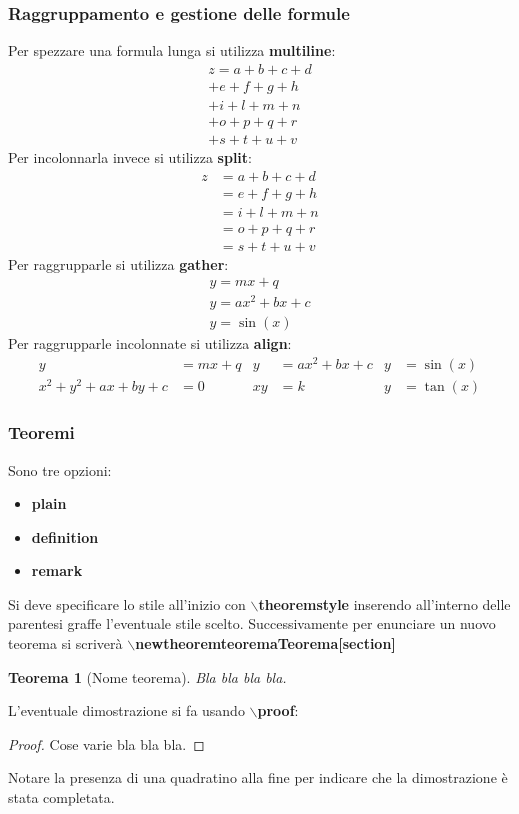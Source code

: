 \documentclass[a4paper, 12pt]{book}
\theoremstyle{plain}
\newtheorem{teorema}{Teorema}[section]
\begin{document}
	\subsubsection{Raggruppamento e gestione delle formule}
	Per spezzare una formula lunga si utilizza \textbf{multiline}:
	\begin{multline}
		z = a + b + c + d\\
		+ e + f + g + h\\
		+ i + l + m + n\\
		+ o + p + q + r\\
		+ s + t + u + v
	\end{multline}
	Per incolonnarla invece si utilizza \textbf{split}:
	\[
	\begin{split}
		z &= a + b + c + d\\
		&= e + f + g + h\\
		&= i + l + m + n\\
		&= o + p + q + r\\
		&= s + t + u + v
	\end{split}
	\]
	Per raggrupparle si utilizza \textbf{gather}:
	\begin{gather}
		y = mx + q\\
		y = ax^2 + bx + c\\
		y = \sin(x)
	\end{gather}
	Per raggrupparle incolonnate si utilizza \textbf{align}:
	\begin{align}
		y &= mx + q & y &= ax^2 + bx + c & y &= \sin(x)\\
		x^2 + y^2 + ax + by + c &= 0 & xy &= k & y &= \tan(x)
	\end{align}
	
	\subsubsection{Teoremi}
	Sono tre opzioni:
	\begin{itemize}
		\item \textbf{plain}
		\item \textbf{definition}
		\item \textbf{remark}
	\end{itemize}
	Si deve specificare lo stile all'inizio con \textbf{$\backslash$theoremstyle{}}
	inserendo all'interno delle parentesi graffe l'eventuale stile scelto.
	Successivamente per enunciare un nuovo teorema si scriverà
	\textbf{$\backslash$newtheorem{teorema}{Teorema}[section]}
	\begin{teorema}[Nome teorema]
		Bla bla bla bla.
	\end{teorema}	
	L'eventuale dimostrazione si fa usando \textbf{$\backslash$proof}:
	\begin{proof}
		Cose varie bla bla bla.
	\end{proof}	
	Notare la presenza di una quadratino alla fine per indicare che la 
	dimostrazione è stata completata.
\end{document}
